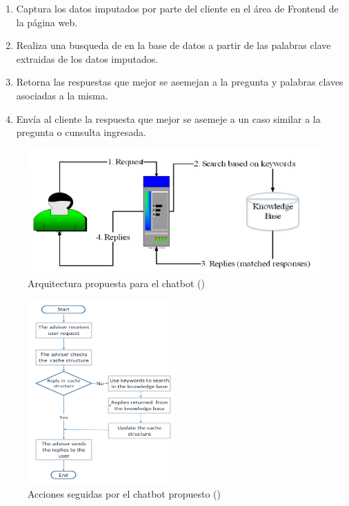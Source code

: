 \begin{enumerate}
    \item Captura los datos imputados por parte del cliente en el área de Frontend de la página web.
    \item Realiza una busqueda de en la base de datos a partir de las palabras clave extraidas de los datos imputados.
    \item Retorna las respuestas que mejor se asemejan a la pregunta y palabras claves asociadas a la misma.
    \item Envía al cliente la respuesta que mejor se asemeje a un caso similar a la pregunta o cunsulta ingresada.
\end{enumerate}

\begin{figure}[h]
	\begin{center}
		\includegraphics[width=1\textwidth]{2/figures/1_1.png}
		\caption{Arquitectura propuesta para el chatbot (\cite{pr_A_Chatbot_for_Information_Security})}
	\end{center}
\end{figure}

\begin{figure}[h]
	\begin{center}
		\includegraphics[width=0.50\textwidth]{2/figures/1_2.png}
		\caption{Acciones seguidas por el chatbot propuesto (\cite{pr_A_Chatbot_for_Information_Security})}
	\end{center}
\end{figure}

